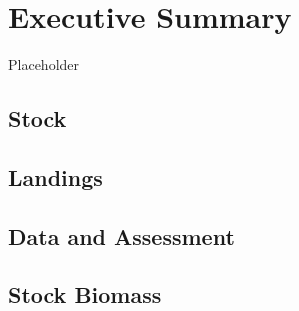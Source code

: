 \documentclass[11pt,
  english,
  a4paper,
]{article}
\begin{document}
\renewcommand{\thetable}{\roman{table}}
\renewcommand{\thefigure}{\roman{figure}}

\setlength\parskip{0.5em plus 0.1em minus 0.2em}


\hypertarget{executive-summary}{%
\section*{Executive Summary}\label{executive-summary}}

\leavevmode\tagmcend\tagstructend

Placeholder


\hypertarget{stock}{%
\subsection*{Stock}\label{stock}}

\leavevmode\tagmcend\tagstructend


\hypertarget{landings}{%
\subsection*{Landings}\label{landings}}

\leavevmode\tagmcend\tagstructend


\hypertarget{data-and-assessment}{%
\subsection*{Data and Assessment}\label{data-and-assessment}}

\leavevmode\tagmcend\tagstructend


\hypertarget{stock-biomass}{%
\subsection*{Stock Biomass}\label{stock-biomass}}
\end{document}
